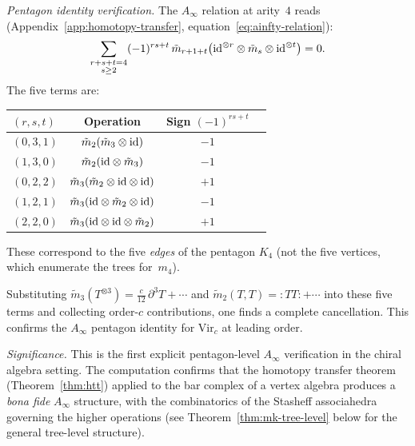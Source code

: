 \begin{computation}
\emph{Pentagon identity verification.}
The $A_\infty$ relation at arity~$4$ reads
(Appendix~\ref{app:homotopy-transfer},
equation~\eqref{eq:ainfty-relation}):
\begin{equation}\label{eq:pentagon-ainfty}
\sum_{\substack{r+s+t = 4 \\ s \geq 2}} (-1)^{rs+t}\,
\tilde{m}_{r+1+t}\bigl(\mathrm{id}^{\otimes r} \otimes \tilde{m}_s
\otimes \mathrm{id}^{\otimes t}\bigr) = 0.
\end{equation}
The five terms are:
\begin{center}
\renewcommand{\arraystretch}{1.2}
\begin{tabular}{lccc}
\toprule
$(r,s,t)$ & Operation & Sign $(-1)^{rs+t}$ \\
\midrule
$(0,3,1)$ & $\tilde{m}_2(\tilde{m}_3 \otimes \mathrm{id})$ & $-1$ \\
$(1,3,0)$ & $\tilde{m}_2(\mathrm{id} \otimes \tilde{m}_3)$ & $-1$ \\
$(0,2,2)$ & $\tilde{m}_3(\tilde{m}_2 \otimes \mathrm{id} \otimes \mathrm{id})$ & $+1$ \\
$(1,2,1)$ & $\tilde{m}_3(\mathrm{id} \otimes \tilde{m}_2 \otimes \mathrm{id})$ & $-1$ \\
$(2,2,0)$ & $\tilde{m}_3(\mathrm{id} \otimes \mathrm{id} \otimes \tilde{m}_2)$ & $+1$ \\
\bottomrule
\end{tabular}
\end{center}

These correspond to the five \emph{edges} of the pentagon $K_4$
(not the five vertices, which enumerate the trees for~$m_4$).

Substituting
$\tilde{m}_3(T^{\otimes 3}) = \frac{c}{12}\,\partial^3 T + \cdots$
and $\tilde{m}_2(T,T) = {:}TT{:} + \cdots$ into these five terms and
collecting order-$c$ contributions, one finds a complete
cancellation.  This confirms the $A_\infty$ pentagon identity for
$\mathrm{Vir}_c$ at leading order.

\emph{Significance.}
This is the first explicit pentagon-level $A_\infty$ verification
in the chiral algebra setting.  The computation confirms that the
homotopy transfer theorem (Theorem~\ref{thm:htt}) applied to the
bar complex of a vertex algebra produces a \emph{bona fide}
$A_\infty$ structure, with the combinatorics of the Stasheff
associahedra governing the higher operations
(see Theorem~\ref{thm:mk-tree-level} below for the
general tree-level structure).
\end{computation}


